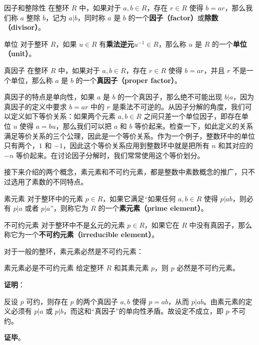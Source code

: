 \begin{definition}{因子和整除性}
在整环 $R$ 中，如果对于 $a, b\in R$，存在 $r\in R$ 使得 $b=ar$，那么我们称 $a$ 整除 $b$，记为 $a|b$，同时称 $a$ 是 $b$ 的一个\textbf{因子（factor）}或\textbf{除数（divisor）}。
\end{definition}

\begin{definition}{单位}
对于整环 $R$，如果 $u\in R$ 有\textbf{乘法逆元}$u^{-1}\in R$，那么称 $u$ 是 $R$ 的一个\textbf{单位（unit）}。
\end{definition}

\begin{definition}{真因子}
在整环 $R$ 中，如果对于 $a, b\in R$，存在 $r\in R$ 使得 $b=ar$，并且 $r$ 不是一个单位，那么称 $a$ 是 $b$ 的一个\textbf{真因子（proper factor）}。
\end{definition}

真因子的特点是单向性，如果 $a$ 是 $b$ 的一个真因子，那么绝不可能出现 $b|a$，因为真因子的定义中要求 $b=ar$ 中的 $r$ 是乘法不可逆的。从因子分解的角度，我们可以定义如下等价关系：如果两个元素 $a, b\in R$ 之间只差一个单位因子，即存在单位 $u$ 使得 $a=bu$，那么我们可以把 $a$ 和 $b$ 等价起来。检查一下，如此定义的关系满足等价关系的三个公理，因此是一个等价关系。作为一个例子，整数环中的单位只有两个，$1$ 和 $-1$，因此这个等价关系应用到整数环中就是把所有 $n$ 和其对应的 $-n$ 等价起来。在讨论因子分解时，我们常常使用这个等价划分。

接下来介绍的两个概念，素元素和不可约元素，都是整数中素数概念的推广，只不过选用了素数的不同特点。

\begin{definition}{素元素}
对于整环中的元素 $p\in R$，如果它满足“如果任何 $a, b\in R$ 使得 $p|ab$，则必有 $p|a$ 或者 $p|a$”，则称它为 $R$ 的一个\textbf{素元素（prime element）}。
\end{definition}

\begin{definition}{不可约元素}
对于整环中不是幺元的元素 $p\in R$，如果它在 $R$ 中没有真因子，那么称它为一个\textbf{不可约元素（irreducible element）}。
\end{definition}

对于一般的整环，素元素必然是不可约元素：

\begin{theorem}{素元素必是不可约元素}
给定整环 $R$ 和其素元素 $p$，则 $p$ 必然是不可约元素。
\end{theorem}

\textbf{证明}：

反设 $p$ 可约，则存在 $p$ 的两个真因子 $a, b$ 使得 $p=ab$，从而 $p|ab$。由素元素的定义必须有 $p|a$ 或 $p|b$，而这和“真因子”的单向性矛盾。故设定不成立，即 $p$ 不可约。

\textbf{证毕}。



